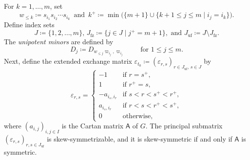 \documentclass[11pt]{amsart}
\numberwithin{equation}{section}
\theoremstyle{plain}
\theoremstyle{definition}
\numberwithin{equation}{section}
\newcommand{\uf}{\mathrm{uf}}
\begin{document}
For $k = 1, \dots, m$, set
$$
w_{\leq k} \coloneqq s_{i_1} s_{i_2} \cdots s_{i_k} \, \mbox{ and } \, k^+ \coloneqq \min \bigl( \{ m+1 \} \cup \{  k+1 \le j \le m \mid i_j = i_k \} \bigr). 
$$
Define index sets
$$
J \coloneqq \{ 1,2, \dots, m \}, \, J_\mathrm{fz} \coloneqq \{ j \in J \mid j^+ = m+1 \}, \mbox{ and } J_\uf \coloneqq J \setminus J_\mathrm{fz}.
$$
The \emph{unipotent minors} are defined by
$$
D_j \coloneqq D_{w_{\leq j} \varpi_{i_j}, \varpi_{i_j}} \qquad \text{ for $1 \leq j \leq m$}.
$$
Next, define the extended exchange matrix $\varepsilon_{t_0} \coloneqq (\varepsilon_{r,s})_{r \in J_{\uf},\, s \in J}$ by
\begin{equation}\label{equ_GLSseed}
\varepsilon_{r,s} =
\begin{cases}
-1 & \text{if } r = s^+, \\
1 & \text{if } r^+ = s, \\
-a_{i_s,i_r} & \text{if } s < r < s^+ < r^+, \\
a_{i_s,i_r} & \text{if } r < s < r^+ < s^+, \\
0 & \text{otherwise,}
\end{cases}
\end{equation}
where $(a_{i,j})_{i,j \in I}$ is the Cartan matrix $\textsf{A}$ of $G$. The principal submatrix $(\varepsilon_{r,s})_{r,s \in J_\uf}$ is skew-symmetrizable, and it is skew-symmetric if and only if $\textsf{A}$ is symmetric.  
\end{document}
